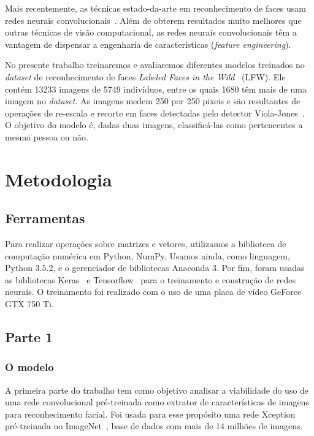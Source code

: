 \documentclass{bmvc2k}
\begin{document}
Mais recentemente, as técnicas estado-da-arte em reconhecimento de faces usam redes neurais convolucionais~\cite{siamese, triplet}. Além de obterem resultados muito melhores que outras técnicas de visão computacional, as redes neurais convolucionais têm a vantagem de dispensar a engenharia de características (\textit{feature engineering}).

No presente trabalho treinaremos e avaliaremos diferentes modelos treinados no \textit{dataset} de reconhecimento de faces \textit{Labeled Faces in the Wild}~\cite{lfw} (LFW). Ele contém 13233 imagens de 5749 indivíduos, entre os quais 1680 têm mais de uma imagem no \textit{dataset}. As imagens medem 250 por 250 pixeis e são resultantes de operações de re-escala e recorte em faces detectadas pelo detector Viola-Jones~\cite{viola}. O objetivo do modelo é, dadas duas imagens, classificá-las como pertencentes a mesma pessoa ou não.

\section{Metodologia}
\label{sec:met}

\subsection{Ferramentas}
Para realizar operações sobre matrizes e vetores, utilizamos a biblioteca de computação numérica em Python, NumPy. Usamos ainda, como linguagem, Python 3.5.2, e o gerenciador de bibliotecas Anaconda 3. Por fim, foram usadas as bibliotecas Keras~\cite{chollet2015keras} e Tensorflow~\cite{tensorflow2015-whitepaper} para o treinamento e construção de redes neurais. O treinamento foi realizado com o uso de uma placa de vídeo GeForce GTX 750 Ti.


\subsection{Parte 1}
\subsubsection{O modelo}
A primeira parte do trabalho tem como objetivo analisar a viabilidade do uso de uma rede convolucional pré-treinada como extrator de características de imagens para reconhecimento facial. Foi usada para esse propósito uma rede Xception~\cite{xception} pré-treinada no ImageNet~\cite{imagenet}, base de dados com mais de 14 milhões de imagens.
\end{document}
